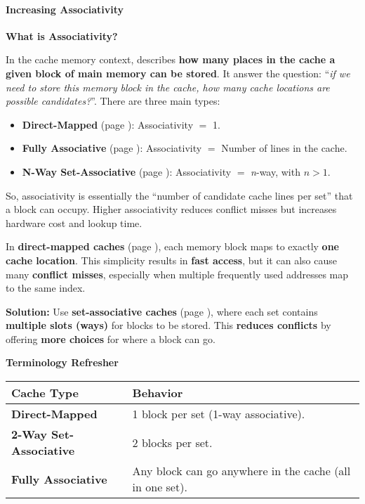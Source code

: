 \paragraph{Increasing Associativity}

\begin{flushleft}
    \textcolor{Green3}{ \textbf{What is Associativity?}}
\end{flushleft}
In the cache memory context,  describes \textbf{how many places in the cache a given block of main memory can be stored}. It answer the question: ``\emph{if we need to store this memory block in the cache, how many cache locations are possible candidates?}''. There are three main types:
\begin{itemize}
    \item \textbf{Direct-Mapped} (page \pageref{def: Direct-Mapped Cache}): Associativity $=$ 1.
    \item \textbf{Fully Associative} (page \pageref{def: Fully Associative Cache}): Associativity $=$ Number of lines in the cache.
    \item \textbf{N-Way Set-Associative} (page \pageref{def: n-way set-associative cache}): Associativity $=$ \emph{n}-way, with $n > 1$.
\end{itemize}
So, associativity is essentially the ``number of candidate cache lines per set'' that a block can occupy. Higher associativity reduces conflict misses but increases hardware cost and lookup time.

\highspace
In \textbf{direct-mapped caches} (page \pageref{def: Direct-Mapped Cache}), each memory block maps to exactly \textbf{one cache location}. This simplicity results in \textbf{fast access}, but it can also cause many \textbf{conflict misses}, especially when multiple frequently used addresses map to the same index.

\highspace
\textcolor{Green3}{ \textbf{Solution:}} Use \textbf{set-associative caches} (page \pageref{def: n-way set-associative cache}), where each set contains \textbf{multiple slots (ways)} for blocks to be stored. This \textbf{reduces conflicts} by offering \textbf{more choices} for where a block can go.

\highspace
\begin{flushleft}
    \textcolor{Green3}{ \textbf{Terminology Refresher}}
\end{flushleft}
\begin{table}[!htp]
    \centering
    \begin{tabular}{@{} l p{22em} @{}}
        \toprule
        Cache Type & Behavior \\
        \midrule
        \textbf{Direct-Mapped}          & 1 block per set (1-way associative). \\ [.3em]
        \textbf{2-Way Set-Associative}  & 2 blocks per set. \\ [.3em]
        \textbf{Fully Associative}      & Any block can go anywhere in the cache (all in one set). \\
        \bottomrule
    \end{tabular}
\end{table}

